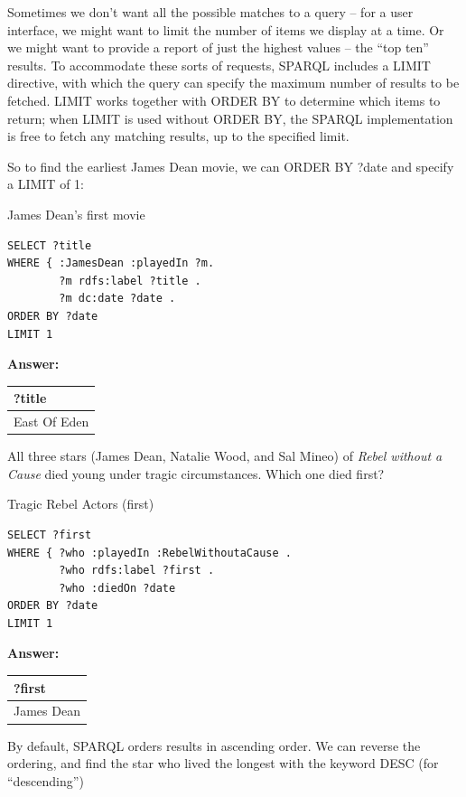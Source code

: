 Sometimes we don't want all the possible matches to a query -- for a
user interface, we might want to limit the number of items we display at
a time. Or we might want to provide a report of just the highest values
-- the ``top ten'' results. To accommodate these sorts of requests,
SPARQL includes a LIMIT directive, with which the query can specify the
maximum number of results to be fetched. LIMIT works together with ORDER
BY to determine which items to return; when LIMIT is used without ORDER
BY, the SPARQL implementation is free to fetch any matching results, up
to the specified limit.

So to find the earliest James Dean movie, we can ORDER BY ?date and
specify a LIMIT of 1:

\begin{query}James Dean's first movie\end{query}

\begin{lstlisting}
SELECT ?title
WHERE { :JamesDean :playedIn ?m.
        ?m rdfs:label ?title .
        ?m dc:date ?date . 
ORDER BY ?date
LIMIT 1
\end{lstlisting}

\textbf{\textbf{Answer:}}

\begin{tabular}{|l|}
\hline
?title\\
\hline
East Of Eden\\
\hline
\end{tabular}

All three stars (James Dean, Natalie Wood, and Sal Mineo) of \emph{Rebel
without a Cause} died young under tragic circumstances. Which one died
first?

\begin{query}Tragic Rebel Actors (first)\end{query}

\begin{lstlisting}
SELECT ?first
WHERE { ?who :playedIn :RebelWithoutaCause .
        ?who rdfs:label ?first .
        ?who :diedOn ?date
ORDER BY ?date
LIMIT 1
\end{lstlisting}


\textbf{\textbf{Answer:}}

\begin{tabular}{|l|}
\hline
?first\\
\hline
James Dean\\
\hline
\end{tabular}

By default, SPARQL orders results in ascending order. We can reverse the
ordering, and find the star who lived the longest with the keyword DESC
(for ``descending'')

